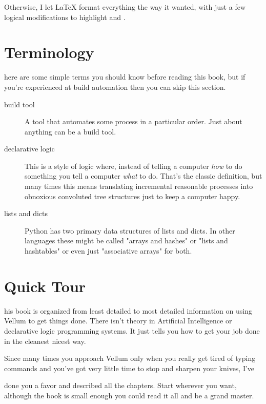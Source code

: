 Otherwise, I let LaTeX format everything the way it wanted, with just a few
logical modifications to highlight  and .




\chapter*{Terminology}

here are some simple terms you should know before reading this book, but if
you're experienced at build automation then you can skip this section.

\begin{description}
\item [build tool] A tool that automates some process in a particular order.
Just about anything can be a build tool.
\item [declarative logic]  This is a style of logic where, instead of telling a
computer \emph{how} to do something you tell a computer \emph{what} to do.
That's the classic definition, but many times this means translating incremental
reasonable processes into obnoxious convoluted tree structures just to keep a
computer happy.
\item [lists and dicts] Python has two primary data structures of lists and
dicts.  In other languages these might be called "arrays and hashes" or "lists
and hashtables" or even just "associative arrays" for both.
\end{description}



\chapter*{Quick Tour}

his book is organized from least detailed to most detailed information on using
Vellum to get things done.  There isn't theory in Artificial Intelligence or
declarative logic programming systems.  It just tells you how to get your job
done in the cleanest nicest way.

Since many times you approach Vellum only when you really get tired of typing
commands and you've got very little time to stop and sharpen your knives, I've


done you a favor and described all the chapters.  Start wherever you want,
although the book is small enough you could read it all and be a grand
master.

